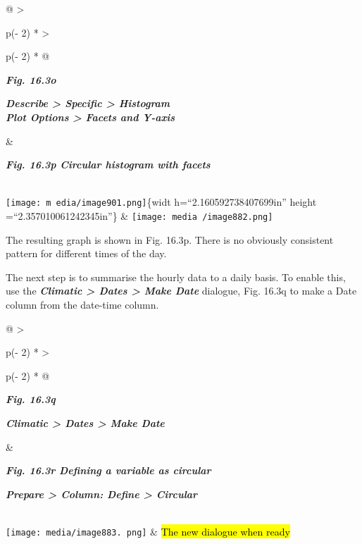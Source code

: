 \documentclass[
  letterpaper,
  DIV=11,
  numbers=noendperiod]{scrreprt}
\begin{document}
\begin{longtable}[]{@{}
  >{\raggedright\arraybackslash}p{(\columnwidth - 2\tabcolsep) * }
  >{\raggedright\arraybackslash}p{(\columnwidth - 2\tabcolsep) * }@{}}
\toprule\noalign{}
\begin{minipage}[b]{\linewidth}\raggedright
\textbf{\emph{Fig. 16.3o}}

\textbf{\emph{Describe \textgreater{} Specific \textgreater{}
Histogram\\
Plot Options \textgreater{} Facets and Y-axis}}\strut
\end{minipage} & \begin{minipage}[b]{\linewidth}\raggedright
\textbf{\emph{Fig. 16.3p Circular histogram with facets}}
\end{minipage} \\
\midrule\noalign{}
\endhead
\bottomrule\noalign{}
\endlastfoot
\texttt{[image: m edia/image901.png]}\{widt h=``2.160592738407699in''
height =``2.357010061242345in''\} &
\texttt{[image: media /image882.png]} \\
\end{longtable}

The resulting graph is shown in Fig. 16.3p. There is no obviously
consistent pattern for different times of the day.

The next step is to summarise the hourly data to a daily basis. To
enable this, use the \textbf{\emph{Climatic \textgreater{} Dates
\textgreater{} Make Date}} dialogue, Fig. 16.3q to make a Date column
from the date-time column.

\begin{longtable}[]{@{}
  >{\raggedright\arraybackslash}p{(\columnwidth - 2\tabcolsep) * }
  >{\raggedright\arraybackslash}p{(\columnwidth - 2\tabcolsep) * }@{}}
\toprule\noalign{}
\begin{minipage}[b]{\linewidth}\raggedright
\textbf{\emph{Fig. 16.3q}}

\textbf{\emph{Climatic \textgreater{} Dates \textgreater{} Make Date}}
\end{minipage} & \begin{minipage}[b]{\linewidth}\raggedright
\textbf{\emph{Fig. 16.3r Defining a variable as circular}}

\textbf{\emph{Prepare \textgreater{} Column: Define \textgreater{}
Circular}}
\end{minipage} \\
\midrule\noalign{}
\endhead
\bottomrule\noalign{}
\endlastfoot
\texttt{[image: media/image883. png]}
& \hl{The new dialogue when ready} \\
\end{longtable}
\end{document}
